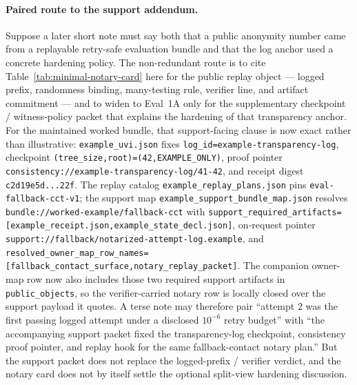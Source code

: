 \documentclass[11pt]{article}
\begin{document}
\paragraph{Paired route to the support addendum.}
Suppose a later short note must say both that a public anonymity number came from a replayable retry-safe evaluation bundle and that the log anchor used a concrete hardening policy.
The non-redundant route is to cite Table~\ref{tab:minimal-notary-card} here for the public replay object --- logged prefix, randomness binding, many-testing rule, verifier line, and artifact commitment --- and to widen to Eval~1A only for the supplementary checkpoint / witness-policy packet that explains the hardening of that transparency anchor.\cite{series:evalnotaryaddendum}
For the maintained worked bundle, that support-facing clause is now exact rather than illustrative: \nolinkurl{example_uvi.json} fixes \nolinkurl{log_id=example-transparency-log}, checkpoint \nolinkurl{(tree_size,root)=(42,EXAMPLE_ONLY)}, proof pointer \nolinkurl{consistency://example-transparency-log/41-42}, and receipt digest \nolinkurl{c2d19e5d...22f}. The replay catalog \nolinkurl{example_replay_plans.json} pins \nolinkurl{eval-fallback-cct-v1}; the support map \nolinkurl{example_support_bundle_map.json} resolves \nolinkurl{bundle://worked-example/fallback-cct} with \nolinkurl{support_required_artifacts=[example_receipt.json,example_state_decl.json]}, on-request pointer \nolinkurl{support://fallback/notarized-attempt-log.example}, and \nolinkurl{resolved_owner_map_row_names=[fallback_contact_surface,notary_replay_packet]}. The companion owner-map row now also includes those two required support artifacts in \nolinkurl{public_objects}, so the verifier-carried notary row is locally closed over the support payload it quotes. A terse note may therefore pair ``attempt $2$ was the first passing logged attempt under a disclosed $10^{-6}$ retry budget'' with ``the accompanying support packet fixed the transparency-log checkpoint, consistency proof pointer, and replay hook for the same fallback-contact notary plan.''
But the support packet does not replace the logged-prefix / verifier verdict, and the notary card does not by itself settle the optional split-view hardening discussion.
\end{document}
